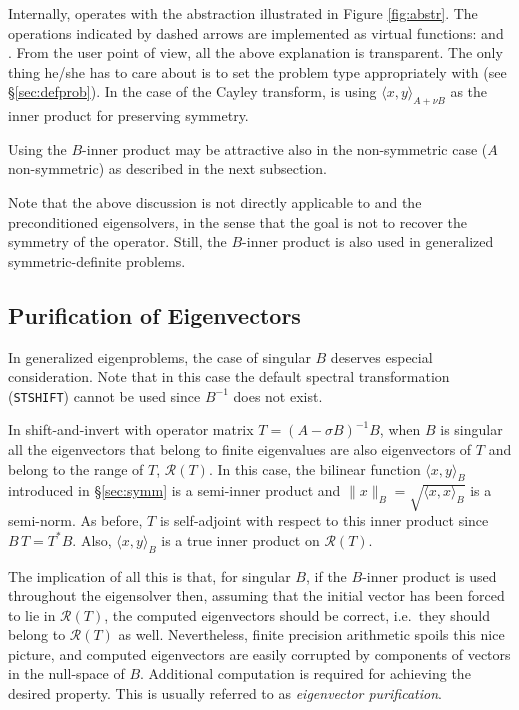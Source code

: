 	Internally, \slepc operates with the abstraction illustrated in Figure \ref{fig:abstr}. The operations indicated by dashed arrows are implemented as virtual functions:  and . From the user point of view, all the above explanation is transparent. The only thing he/she has to care about is to set the problem type appropriately with  (see \S\ref{sec:defprob}).
	In the case of the Cayley transform, \slepc is using $\langle x,y\rangle_{A+\nu B}$ as the inner product for preserving symmetry.

	Using the $B$-inner product may be attractive also in the non-symmetric case ($A$ non-symmetric) as described in the next subsection.

	Note that the above discussion is not directly applicable to  and the preconditioned eigensolvers, in the sense that the goal is not to recover the symmetry of the operator. Still, the $B$-inner product is also used in generalized symmetric-definite problems.

\subsection{Purification of Eigenvectors}
\label{sec:purif}

In generalized eigenproblems, the case of singular $B$ deserves especial consideration. Note that in this case the default spectral transformation (\texttt{STSHIFT}) cannot be used since $B^{-1}$ does not exist.

In shift-and-invert with operator matrix $T=(A-\sigma B)^{-1}B$, when $B$ is singular all the eigenvectors that belong to finite eigenvalues are also eigenvectors of $T$ and belong to the range of $T$, $\mathcal{R}(T)$. In this case, the bilinear function $\langle x,y\rangle_B$ introduced in \S\ref{sec:symm} is a semi-inner product and $\|x\|_B=\sqrt{\langle x,x\rangle_B}$ is a semi-norm. As before, $T$ is self-adjoint with respect to this inner product since $B\,T=T^*B$. Also, $\langle x,y\rangle_B$ is a true inner product on $\mathcal{R}(T)$.

The implication of all this is that, for singular $B$, if the $B$-inner product is used throughout the eigensolver then, assuming that the initial vector has been forced to lie in $\mathcal{R}(T)$, the computed eigenvectors should be correct, i.e.~they should belong to $\mathcal{R}(T)$ as well. Nevertheless, finite precision arithmetic spoils this nice picture, and computed eigenvectors are easily corrupted by components of vectors in the null-space of $B$. Additional computation is required for achieving the desired property. This is usually referred to as \emph{eigenvector purification}.


